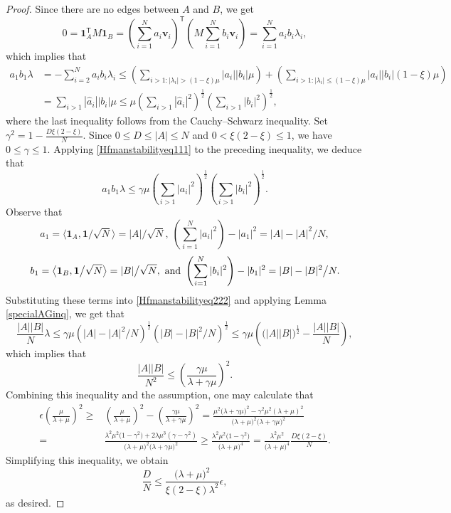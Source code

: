 \documentclass[11pt]{article}
\numberwithin{equation}{section}
\def\v{\mathbf{v}}
\def\1{\mathbf{1}}
\begin{document}
\begin{proof}
Since there are no edges between $A$ and $B$, we get
$$0=\1_A^{\mathsf T}M\1_B=\left(\sum_{i=1}^N a_i\v_i\right)^{\!\mathsf T}
\left(M\sum_{i=1}^N b_i \v_i\right)
=\sum_{i=1}^N a_ib_i \lambda_i,$$
which implies that
\begin{align*}
a_1b_1\lambda & = -\sum_{i=2}^N a_ib_i \lambda_i
\leq \left(\sum_{ i>1: |\lambda_i|>(1-\xi) \mu  }  |a_i||b_i|\mu\right) +
\left(\sum_{ i>1: |\lambda_i|\leq(1-\xi) \mu  }  |a_i||b_i| (1-\xi) \mu\right) \\
&= \sum_{ i>1} |\widehat{a}_i||b_i|   \mu
\leq  \mu  \left(\sum_{ i>1} |\widehat{a}_i|^2\right)^{\frac{1}{2}}\left(\sum_{ i>1} |b_i|^2\right)^{\frac{1}{2}},
\end{align*}
where the last inequality follows from the Cauchy--Schwarz inequality.
Set $\gamma^2= 1-\frac{D \xi(2-\xi)}{N} $.
Since $0\leq D\leq |A|\leq N$ and $0<\xi(2-\xi)\leq1$,
we have $0\leq\gamma\leq1$.
Applying \eqref{Hfmanstabilityeq111} to the preceding inequality, we deduce that
\begin{equation}\label{Hfmanstabilityeq222}
a_1b_1\lambda
\leq   \gamma \mu  %
\left(\sum_{ i>1} |a_i|^2\right)^{\frac{1}{2}}\left(\sum_{ i>1} |b_i|^2\right)^{\frac{1}{2}} .
\end{equation}
Observe that
$$a_1=\big\langle \1_A,\1\big/\sqrt{N}\big\rangle=|A| \big/\sqrt{N},
~ \left(\sum_{ i=1}^N |a_i|^2\right)-|a_1|^2=|A|-|A|^2\big/ N,$$
$$b_1=\big\langle \1_B,\1\big/\sqrt{N}\big\rangle=|B| \big/\sqrt{N},
~{\rm and~} \left(\sum_{ i=1}^N |b_i|^2\right)-|b_1|^2=|B|-|B|^2\big/ N.$$
Substituting these terms into \eqref{Hfmanstabilityeq222} and applying Lemma \ref{specialAGinq}, we get that
\begin{equation}\label{Hfmanstabilityeq333}
\frac{|A||B|}{N} \lambda
\leq \gamma  \mu
\left(|A|-|A|^2 / N \right)^{\frac{1}{2}}
\left(|B|-|B|^2 / N \right)^{\frac{1}{2}}
\leq  \gamma \mu
\left( \big(|A||B|\big)^{\frac{1}{2}}- \frac{|A||B|}{N} \right),
\end{equation}
which implies that
$$
\frac{|A||B|}{N^2}
\leq \left(\frac{\gamma\mu }{\lambda  +\gamma \mu }\right)^2.
$$
Combining this inequality and the assumption,
one may calculate that
\begin{align*}
\epsilon \left(\frac{\mu }{\lambda  +\mu }\right)^2
\geq &\left(\frac{ \mu  }{\lambda  +  \mu }\right)^2
-\left(\frac{\gamma\mu }{\lambda  +\gamma \mu  }\right)^2
=\frac{ \mu^2 \big(\lambda  +  \gamma\mu \big)^2
- \gamma^2\mu^2 (\lambda  +  \mu)^2}
{\big(\lambda +  \mu  \big)^2\big(\lambda  +  \gamma\mu  \big)^2}
\\
=&\frac{\lambda^2\mu^2\big(1-\gamma ^2\big)+2\lambda\mu^3(\gamma-\gamma ^2)}
{\big(\lambda  +  \mu  \big)^2\big(\lambda  +  \gamma\mu  \big)^2}
\geq \frac{ \lambda^2\mu^2\big(1- \gamma ^2\big) }
{\big(\lambda  +  \mu  \big)^4}=\frac{ \lambda^2\mu^2 }
{\big(\lambda  +  \mu  \big)^4}\frac{D \xi(2-\xi)}{N}.
\end{align*}
Simplifying this inequality, we obtain
$$\frac{D }{N} \leq
\frac{\big(\lambda +  \mu  \big)^2 }{ \xi(2-\xi)\lambda ^2} \epsilon,$$
as desired.
\end{proof}
\end{document}
